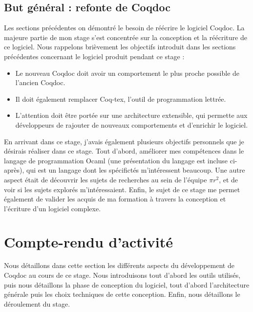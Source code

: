 \documentclass[a4paper, 11pt]{report}
\newcommand{\pir}[0]{\textbf{$\pi r^2$}\xspace}
\begin{document}
    \clearpage
    \subsection{But général : refonte de Coqdoc}
    Les sections précédentes on démontré le besoin de réécrire le logiciel
    Coqdoc. La majeure partie de mon stage s'est concentrée sur la conception
    et la réécriture de ce logiciel.
    Nous rappelons brièvement les objectifs introduit dans les sections
    précédentes concernant le logiciel produit pendant ce stage :
    \begin{itemize}
      \item Le nouveau Coqdoc doit avoir un comportement le plus proche
        possible de l'ancien Coqdoc.
      \item Il doit également remplacer Coq-tex, l'outil de programmation
        lettrée.
      \item L'attention doit être portée sur une architecture extensible, qui
        permette aux développeurs de rajouter de nouveaux comportements
        et d'enrichir le logiciel.
    \end{itemize}

    En arrivant dans ce stage, j'avais également plusieurs objectifs personnels
    que je désirais réaliser dans ce stage. Tout d'abord, améliorer
    mes compétences dans le langage de programmation Ocaml (une présentation
    du langage est incluse ci-après), qui est un langage dont les spécifictés
    m'intéressent beaucoup.
    Une autre aspect était de découvrir les sujets de recherches au sein de
    l'équipe \pir, et de voir si les sujets explorés m'intéressaient.
    Enfin, le sujet de ce stage me permet également de valider les acquis de
    ma formation à travers la conception et l'écriture d'un logiciel complexe.

  \section{Compte-rendu d'activité}
  Nous détaillons dans cette section les différents aspects du développement de Coqdoc au cours de ce stage.
  Nous introduisons tout d'abord les outils utilisés, puis nous détaillons la phase de conception du logiciel,
  tout d'abord l'architecture générale puis les choix techniques de cette conception. Enfin, nous détaillons
  le déroulement du stage.
\end{document}
